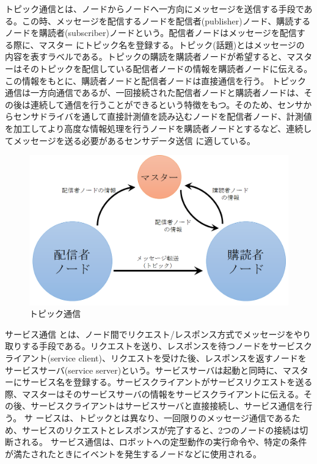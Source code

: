 \begin{definition*}
トピック通信とは、ノードからノードへ一方向にメッセージを送信する手段である。この時、メッセージを配信するノードを配信者(publisher)ノード、購読するノードを購読者(subscriber)ノードという。配信者ノードはメッセージを配信する際に、マスター     にトピック名を登録する。トピック(話題)とはメッセージの内容を表すラベルである。トピックの購読を購読者ノードが希望すると、マスターはそのトピックを配信している配信者ノードの情報を購読者ノードに伝える。この情報をもとに、購読者ノードと配信者ノードは直接通信を行う。
トピック通信は一方向通信であるが、一回接続された配信者ノードと購読者ノードは、その後は連続して通信を行うことができるという特徴をもつ。そのため、センサからセンサドライバを通して直接計測値を読み込むノードを配信者ノード、計測値を加工してより高度な情報処理を行うノードを購読者ノードとするなど、連続してメッセージを送る必要があるセンサデータ送信  に適している。
\end{definition*}

\begin{figure}[htp]
  \centering
  \includegraphics[width=\columnwidth]{pictures/chapter6/pic_06_02.png}
  \caption{トピック通信}
\end{figure}

\begin{definition*}
サービス通信   とは、ノード間でリクエスト/レスポンス方式でメッセージをやり取りする手段である。リクエストを送り、レスポンスを待つノードをサービスクライアント(service client)、リクエストを受けた後、レスポンスを返すノードをサービスサーバ(service server)という。サービスサーバは起動と同時に、マスターにサービス名を登録する。サービスクライアントがサービスリクエストを送る際、マスターはそのサービスサーバの情報をサービスクライアントに伝える。その後、サービスクライアントはサービスサーバと直接接続し、サービス通信を行う。
サ  ービスは、トピックとは異なり、一回限りのメッセージ通信であるため、サービスのリクエストとレスポンスが完了すると、2つのノードの接続は切断される。  サービス通信は、ロボットへの定型動作の実行命令や、特定の条件が満たされたときにイベントを発生するノードなどに使用される。
\end{definition*}

